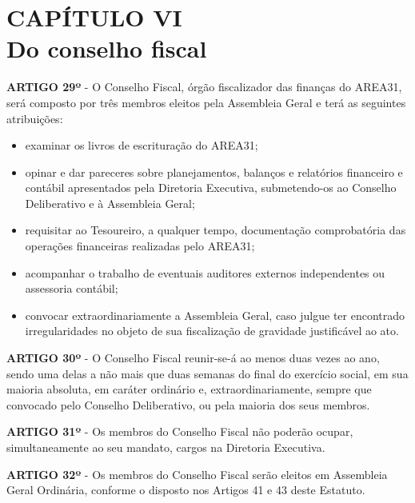 \chapter*{CAPÍTULO VI \\ Do conselho fiscal}


\textbf{ARTIGO 29º} - O Conselho Fiscal, órgão fiscalizador das finanças do 
AREA31, será composto por três membros eleitos pela Assembleia 
Geral e terá as seguintes atribuições:

\begin{itemize}
    \item examinar os livros de escrituração do AREA31;
    \item opinar e dar pareceres sobre planejamentos, balanços e 
        relatórios financeiro e contábil apresentados pela Diretoria 
        Executiva, submetendo-os ao Conselho Deliberativo e à Assembleia Geral;
    \item requisitar ao Tesoureiro, a qualquer tempo, documentação 
        comprobatória das operações financeiras realizadas pelo AREA31;
    \item acompanhar o trabalho de eventuais auditores externos 
        independentes ou assessoria contábil;
    \item convocar extraordinariamente a Assembleia Geral, caso julgue ter 
        encontrado irregularidades no objeto de sua fiscalização 
        de gravidade justificável ao ato.
\end{itemize}

\textbf{ARTIGO 30º} - O Conselho Fiscal reunir-se-á ao menos duas vezes ao 
ano, sendo uma delas a não mais que duas semanas do final do exercício 
social, em sua maioria absoluta, em caráter ordinário e, extraordinariamente, 
sempre que convocado pelo Conselho Deliberativo, ou pela maioria 
dos seus membros.

\bigskip

\textbf{ARTIGO 31º} - Os membros do Conselho Fiscal não poderão ocupar, 
simultaneamente ao seu mandato, cargos na Diretoria Executiva.

\bigskip 

\textbf{ARTIGO 32º} - Os membros do Conselho Fiscal serão eleitos em 
Assembleia Geral Ordinária, conforme o disposto nos Artigos 41 e 
43 deste Estatuto.
